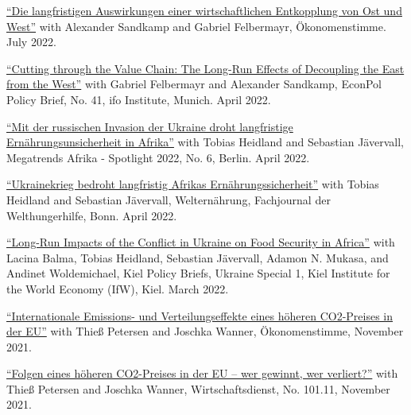 \documentclass{article}
\begin{document}
\begin{minipage}[t]{0.8\textwidth}
    \href{https://www.oekonomenstimme.org/artikel/2022/07/die-langfristigen-auswirkungen-einer-wirtschaftlichen-entkopplung-von-ost-und-west/}{``Die langfristigen Auswirkungen einer wirtschaftlichen Entkopplung von Ost und West''} with Alexander Sandkamp and Gabriel Felbermayr, Ökonomenstimme. July 2022. \par
    \href{https://www.cesifo.org/en/publikationen/2022/working-paper/cutting-through-value-chain-long-run-effects-decoupling-east-west}{``Cutting through the Value Chain: The Long-Run Effects of Decoupling the East from the West''} with Gabriel Felbermayr and Alexander Sandkamp, EconPol Policy Brief, No. 41, ifo Institute, Munich. April 2022. \par
    \href{https://www.megatrends-afrika.de/publikation/mit-der-russischen-invasion-der-ukraine-droht-langfristige-ernaehrungsunsicherheit-in-afrika}{``Mit der russischen Invasion der Ukraine droht langfristige Ernährungsunsicherheit in Afrika''} with Tobias Heidland and Sebastian Jävervall, Megatrends Afrika - Spotlight 2022, No. 6, Berlin. April 2022. \par
    \href{https://www.welthungerhilfe.de/welternaehrung/rubriken/agrar-ernaehrungspolitik/wie-der-ukrainekrieg-afrikas-brotversorgung-trifft/}{``Ukrainekrieg bedroht langfristig Afrikas Ernährungssicherheit''} with Tobias Heidland and Sebastian Jävervall, Welternährung, Fachjournal der Welthungerhilfe, Bonn. April 2022. \par
    \href{https://www.ifw-kiel.de/publications/kiel-policy-brief/ukraine-special/long-run-impacts-of-the-conflict-in-ukraine-on-food-security-in-africa-17165/}{``Long-Run Impacts of the Conflict in Ukraine on Food Security in Africa''} with Lacina Balma, Tobias Heidland, Sebastian Jävervall, Adamon N. Mukasa, and Andinet Woldemichael, Kiel Policy Briefs, Ukraine Special 1, Kiel Institute for the World Economy (IfW), Kiel. March 2022. \par
    \href{https://www.oekonomenstimme.org/artikel/2021/11/internationale-emissions--und-verteilungseffekte-eines-hoeheren-co2-preises-in-der-eu/}{``Internationale Emissions- und Verteilungseffekte eines höheren CO2-Preises in der EU''} with Thieß Petersen and Joschka Wanner, Ökonomenstimme, November 2021. \par
    \href{https://www.wirtschaftsdienst.eu/inhalt/jahr/2021/heft/11/beitrag/folgen-eines-hoeheren-co2-preises-in-der-eu-wer-gewinnt-wer-verliert.html}{``Folgen eines höheren CO2-Preises in der EU – wer gewinnt, wer verliert?''} with Thieß Petersen and Joschka Wanner, Wirtschaftsdienst, No. 101.11, November 2021. \par

\end{minipage}
\end{document}
